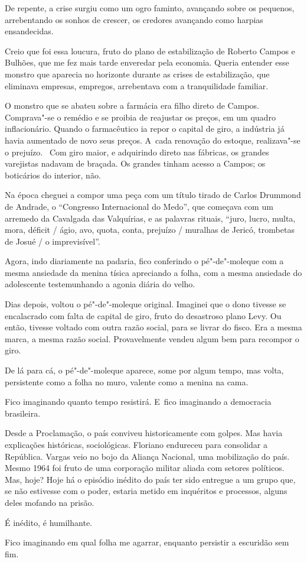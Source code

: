 De repente, a crise surgiu como um ogro faminto, avançando sobre os
pequenos, arrebentando os sonhos de crescer, os credores avançando como
harpias ensandecidas.

Creio que foi essa loucura, fruto do plano de estabilização de Roberto
Campos e Bulhões, que me fez mais tarde enveredar pela economia. Queria
entender esse monstro que aparecia no horizonte durante as crises de
estabilização, que eliminava empresas, empregos, arrebentava com a
tranquilidade familiar.

O monstro que se abateu sobre a farmácia era filho direto de Campos.
Comprava"-se o remédio e se proibia de reajustar os preços, em um quadro
inflacionário. Quando o farmacêutico ia repor o capital de giro, a
indústria já havia aumentado de novo seus preços. A~cada renovação do
estoque, realizava"-se o prejuízo. ~Com giro maior, e adquirindo direto
nas fábricas, os grandes varejistas nadavam de braçada. Os grandes
tinham acesso a Campos; os boticários do interior, não.

Na época cheguei a compor uma peça com um título tirado de Carlos
Drummond de Andrade, o ``Congresso Internacional do Medo'', que começava
com um arremedo da Cavalgada das Valquírias, e as palavras rituais,
``juro, lucro, multa, mora, déficit /\allowbreak{} ágio, avo, quota, conta, prejuízo
/\allowbreak{} muralhas de Jericó, trombetas de Josué /\allowbreak{} o imprevisível''.

Agora, indo diariamente na padaria, fico conferindo o pé"-de"-moleque com
a mesma ansiedade da menina tísica apreciando a folha, com a mesma
ansiedade do adolescente testemunhando a agonia diária do velho.

Dias depois, voltou o pé"-de"-moleque original. Imaginei que o dono
tivesse se encalacrado com falta de capital de giro, fruto do desastroso
plano Levy. Ou então, tivesse voltado com outra razão social, para se
livrar do fisco. Era a mesma marca, a mesma razão social. Provavelmente
vendeu algum bem para recompor o giro.

De lá para cá, o pé"-de"-moleque aparece, some por algum tempo, mas volta,
persistente como a folha no muro, valente como a menina na cama.

Fico imaginando quanto tempo resistirá. E~fico imaginando a democracia
brasileira.

Desde a Proclamação, o país conviveu historicamente com golpes. Mas
havia explicações históricas, sociológicas. Floriano endureceu para
consolidar a República. Vargas veio no bojo da Aliança Nacional, uma
mobilização do país. Mesmo 1964 foi fruto de uma corporação militar
aliada com setores políticos. Mas, hoje? Hoje há o episódio inédito do
país ter sido entregue a um grupo que, se não estivesse com o poder,
estaria metido em inquéritos e processos, alguns deles mofando na
prisão.

É inédito, é humilhante.

Fico imaginando em qual folha me agarrar, enquanto persistir a escuridão
sem fim.
